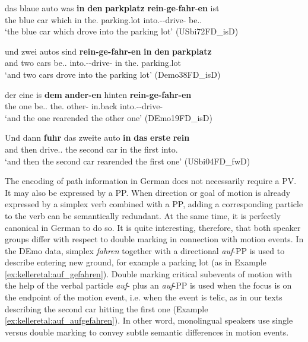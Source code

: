 \documentclass[output=paper,colorlinks,citecolor=brown]{langscibook}
\begin{document}
\ea
\label{ex:kelleretal:in_reingefahren}
\gll das blaue auto was \textbf{in} \textbf{den} \textbf{parkplatz} \textbf{rein}-\textbf{ge}-\textbf{fahr}-\textbf{en} ist\\
the blue car which in the.\Acc{} parking.lot into.\Vpart{}-\Ptcp{}-drive-\Ptcp{} be.\Prs.\Tsg{}\\
\glt `the blue car which drove into the parking lot' (USbi72FD\_isD)

\ex
\label{ex:kelleretal:reingefahren_in}
\gll und zwei autos sind \textbf{rein-ge-fahr-en} \textbf{in} \textbf{den} \textbf{parkplatz}\\
and two cars be.\Prs.\Tpl{} into.\Vpart{}-\Ptcp{}-drive-\Ptcp{} in the.\Acc{} parking.lot\\
\glt `and two cars drove into the parking lot' (Demo38FD\_isD)

\ex
\label{ex:kelleretal:fuhr_rein}
\gll der eine is \textbf{dem} \textbf{ander-en} hinten \textbf{rein-ge-fahr-en}\\
the one be.\Prs.\Tsg{} the.\Dat{} other-\Dat{} in.back into.\Vpart{}-\Ptcp{}-drive-\Ptcp{}\\
\glt `and the one rearended the other one' (DEmo19FD\_isD) 

\ex
\label{ex:kelleretal:dem_reingefahren}
\gll Und dann \textbf{fuhr} das zweite auto \textbf{in} \textbf{das} \textbf{erste} \textbf{rein}\\
and then drive.\Pst.\Tsg{} the second car in the first into.\Vpart{}\\
\glt `and then the second car rearended the first one' (USbi04FD\_fwD)

\z

The encoding of path information in German does not necessarily require a PV. It may also be expressed by a PP. When direction or goal of motion is already expressed by a simplex verb combined with a PP, adding a corresponding particle to the verb can be semantically redundant. At the same time, it is perfectly canonical in German to do so. It is quite interesting, therefore, that both speaker groups differ with respect to double marking in connection with motion events. In the DEmo data, simplex \textit{fahren} together with a directional \textit{auf}-PP is used to describe entering new ground, for example a parking lot (as in Example \ref{ex:kelleretal:auf_gefahren}). Double marking critical subevents of motion with the help of the verbal particle \textit{auf}- plus an \textit{auf}-PP is used when the focus is on the endpoint of the motion event, i.e. when the event is telic, as in our texts describing the second car hitting the first one (Example \ref{ex:kelleretal:auf_aufgefahren}). In other word, monolingual speakers use single versus double marking to convey subtle semantic differences in motion events. 
\end{document}
